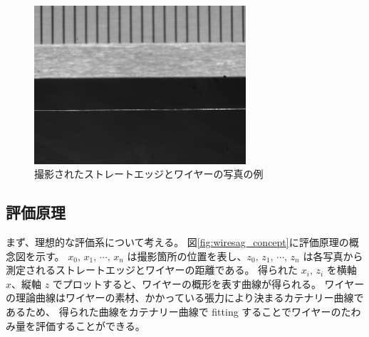 \documentclass[../../main.tex]{subfiles}
\begin{document}
\begin{figure}[H]
    \centering
    \includegraphics[width=0.7\textwidth]{wiresag/20241219_UHF_0_wire23_x467_gray.png}
    \caption{撮影されたストレートエッジとワイヤーの写真の例}
    \label{fig:wiresag_picture}    
\end{figure}
\subsection{評価原理}
\label{subsec:wiresag_principle}
まず、理想的な評価系について考える。
図\ref{fig:wiresag_concept}に評価原理の概念図を示す。
$x_{0},\,x_{1},\,\cdots,\,x_{n}$ は撮影箇所の位置を表し、$z_{0},\,z_{1},\,\cdots,\,z_{n}$ は各写真から測定されるストレートエッジとワイヤーの距離である。
得られた $x_{i},\,z_{i}$ を横軸 $x$、縦軸 $z$ でプロットすると、ワイヤーの概形を表す曲線が得られる。
ワイヤーの理論曲線はワイヤーの素材、かかっている張力により決まるカテナリー曲線であるため、
得られた曲線をカテナリー曲線で fitting することでワイヤーのたわみ量を評価することができる。
\end{document}
